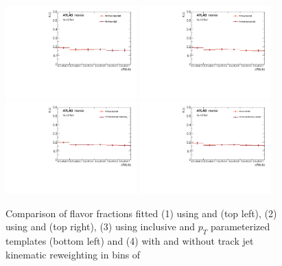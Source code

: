 \begin{figure}[htbp]
  \centering
 \includegraphics[width=0.45\textwidth]{figures/gbb/Sub_Sd0_Fits/Canv_dR_leadCrossCheck.pdf}
 \includegraphics[width=0.45\textwidth]{figures/gbb/Sub_Sd0_Fits/Canv_dR_subsubCrossCheck.pdf}\\
 \includegraphics[width=0.45\textwidth]{figures/gbb/Sub_Sd0_Fits/Canv_dR_ptbinCrossCheck.pdf}
 \includegraphics[width=0.45\textwidth]{figures/gbb/Sub_Sd0_Fits/Canv_dR_noreweightCrossCheck.pdf}\\
\caption{Comparison of flavor fractions fitted (1) using \subsdzero and \sdzero (top left), (2) using \subsdzero and \subsubsdzero (top right), (3) using inclusive and $p_T$ parameterized templates (bottom left) and (4) with and without track jet kinematic reweighting in bins of \drbb}
  \label{fig:dR-fitfrac-crosscheck}
\end{figure}



